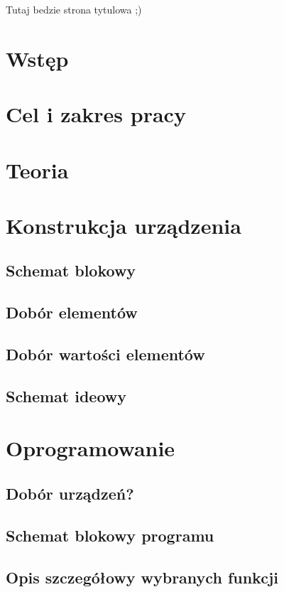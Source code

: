 \documentclass[12pt]{report}
\begin{document}
Tutaj bedzie strona tytulowa ;)
\tableofcontents	%

\chapter{Wstęp} \label{rozdz.wstep} 


\chapter{Cel i zakres pracy} \label{etykietarozdzialu2}


\chapter{Teoria}


\chapter{Konstrukcja urządzenia}
\section{Schemat blokowy}
\section{Dobór elementów}
\section{Dobór wartości elementów}
\section{Schemat ideowy}

\chapter{Oprogramowanie}

\section{Dobór urządzeń?}
\section{Schemat blokowy programu}
\section{Opis szczegółowy wybranych funkcji}
\end{document}

